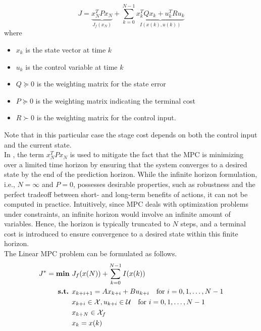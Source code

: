 \begin{equation}
	J = \underset{J_f(x_N)}{\underbrace{ x^T_{N}Px_{N}}} + \sum_{k=0}^{N-1} \underset{I(x(k),u(k))}{\underbrace{ x^T_{k}Qx_{k} + u^T_{k}Ru_{k}}}
	\label{eq:cost_f_2}
\end{equation} 
where
\begin{itemize}
	\item $x_k$ is the state vector at time $k$
	\item $u_k$ is the control variable at time $k$
	\item $Q \succeq 0$ is the weighting matrix for the state error
	\item $P \succeq 0$ is the weighting matrix indicating the terminal cost
	\item $R \succ 0$ is the weighting matrix for the control input.
\end{itemize}
Note that in this particular case the stage cost depends on both the control input and the current state. \\
In , the term $x^T_{N}Px_{N}$ is used to mitigate the fact that the MPC is minimizing over a limited time horizon by ensuring that the system converges to a desired state by the end of the prediction horizon. While the infinite horizon formulation, i.e., $N = \infty$ and $P=0$, possesses desirable properties, such as robustness and the perfect tradeoff between short- and long-term benefits of actions, it can not be computed in practice. Intuitively, since MPC deals with optimization problems under constraints, an infinite horizon would involve an infinite amount of variables. Hence, the horizon is typically truncated to $N$ steps, and a terminal cost is introduced to ensure convergence to a desired state within this finite horizon. \\
The Linear MPC problem can be formulated as follows. \\
\begin{equation}
	\begin{aligned}
		J^* = \text{\textbf{min} }& J_f(x(N)) + \sum_{k =0}^{N-1}I(x(k))\\%
		\text{\textbf{s.t.}	}&x_{k+i+1} = Ax_{k+i} + Bu_{k+i} \quad \text{for } i = 0, 1, \ldots, N-1 \\
		 &x_{k+i} \in \mathcal{X}, u_{k+i} \in \mathcal{U} \quad \text{for } i = 0, 1, \ldots, N-1\\
		 &x_{k+N} \in \mathcal{X}_f\\
		 &x_{k} = x(k)
	\end{aligned}
\end{equation}
